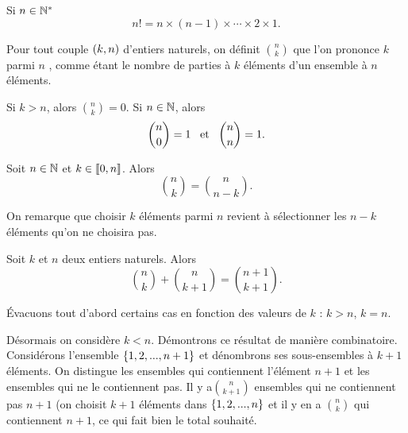 \documentclass{magnoliaold}
\begin{document}
\begin{remarqueUnique}
\remarque Si $n\in{\mathbb{N}^*}$
  \[n!=n\times(n-1)\times\cdots\times 2\times 1.\]
\end{remarqueUnique}

\begin{definition}[utile=-3]
Pour tout couple $\left(k,n\right)$ d'entiers naturels, on définit $\binom{n}{k}$ que l'on prononce \og $k$ parmi $n$ \fg, comme étant le nombre de parties à $k$ éléments d'un ensemble
à $n$ éléments.
\end{definition}

\begin{remarques}
\remarque Si $k>n$, alors $\binom{n}{k}=0$.
\remarque Si $n\in\mathbb{N}$, alors
\[\binom{n}{0}=1 \quad\!\text{et}\quad\! \binom{n}{n}=1.\]
\end{remarques}

\begin{proposition}[utile=-3]
Soit $n\in\mathbb{N}$ et $k\in\left\llbracket 0,n\right\rrbracket$. Alors
\[\binom{n}{k}=\binom{n}{n-k}.\]
\end{proposition}

\begin{preuve}
On remarque que choisir $k$ éléments parmi $n$ revient à sélectionner les $n-k$ éléments qu'on ne choisira pas.\end{preuve}

\begin{proposition}[utile=2, nom=Relation de \nom{Pascal}]
Soit $k$ et $n$ deux entiers naturels. Alors
\[\binom{n}{k}+\binom{n}{k+1}=\binom{n+1}{k+1}.\]
\end{proposition}

\begin{preuve}
\'Evacuons tout d'abord certains cas en fonction des valeurs de $k$ : $k>n$, $k=n$.

Désormais on considère $k<n$. Démontrons ce résultat de manière combinatoire. Considérons l'ensemble $\left\{1, 2, . . . ,n+1\right\}$ et dénombrons ses sous-ensembles à $k+1$ éléments. On distingue les ensembles qui contiennent l'élément $n+1$ et les ensembles qui ne le contiennent pas. Il y a$\binom{n}{k+1}$ ensembles qui ne contiennent pas $n+1$ (on choisit $k+1$ éléments dans $\left\{1, 2, . . . ,n\right\}$ et il y en a $\binom{n}{k}$ qui contiennent $n+1$, ce qui fait bien le total souhaité.

\end{preuve}
\end{document}
